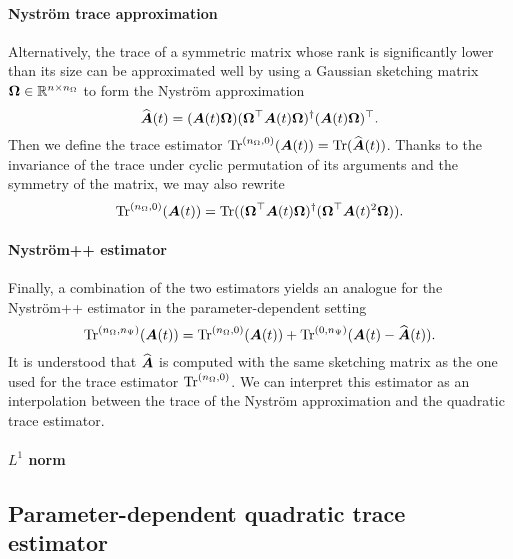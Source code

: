 \documentclass[12pt]{article}
\begin{document}
\paragraph{Nyström trace approximation} Alternatively, the trace of a symmetric matrix whose rank is significantly lower than its size can be approximated well by using a Gaussian sketching matrix $\boldsymbol{\Omega} \in \mathbb{R}^{n \times n_{\Omega}}$ to form the Nyström approximation
\begin{equation}
    \widehat{\boldsymbol{A}}(t) = (\boldsymbol{A}(t) \boldsymbol{\Omega}) (\boldsymbol{\Omega}^{\top} \boldsymbol{A}(t) \boldsymbol{\Omega})^{\dagger} (\boldsymbol{A}(t) \boldsymbol{\Omega})^{\top}.
\end{equation}
Then we define the trace estimator $\operatorname{Tr}^{(n_{\Omega}, 0)}(\boldsymbol{A}(t)) = \operatorname{Tr}( \widehat{\boldsymbol{A}}(t) )$.
Thanks to the invariance of the trace under cyclic permutation of its arguments and the symmetry of the matrix, we may also rewrite
\begin{equation}
    \operatorname{Tr}^{(n_{\Omega}, 0)}(\boldsymbol{A}(t)) = \operatorname{Tr}( (\boldsymbol{\Omega}^{\top} \boldsymbol{A}(t) \boldsymbol{\Omega})^{\dagger} ( \boldsymbol{\Omega}^{\top} \boldsymbol{A}(t)^2 \boldsymbol{\Omega})).
    \label{equ:nystrom-trace-estimator}
\end{equation}

\paragraph{Nyström++ estimator} Finally, a combination of the two estimators yields an analogue for the Nyström++ estimator \cite{persson-2022-improved-variants} in the parameter-dependent setting
\begin{equation}
    \operatorname{Tr}^{(n_{\Omega}, n_{\Psi})}(\boldsymbol{A}(t)) = \operatorname{Tr}^{(n_{\Omega}, 0)}(\boldsymbol{A}(t)) + \operatorname{Tr}^{(0, n_{\Psi})}(\boldsymbol{A}(t) - \widehat{\boldsymbol{A}}(t)).
    \label{equ:nystrompp-trace-estimator}
\end{equation}
It is understood that $\widehat{\boldsymbol{A}}$ is computed with the same sketching matrix as the one used for the trace estimator $\operatorname{Tr}^{(n_{\Omega}, 0)}$. We can interpret this estimator as an interpolation between the trace of the Nyström approximation and the quadratic trace estimator.

\paragraph{$L^{1}$ norm}

\subsection{Parameter-dependent quadratic trace estimator}
\label{subsec:quadratic}
\end{document}
